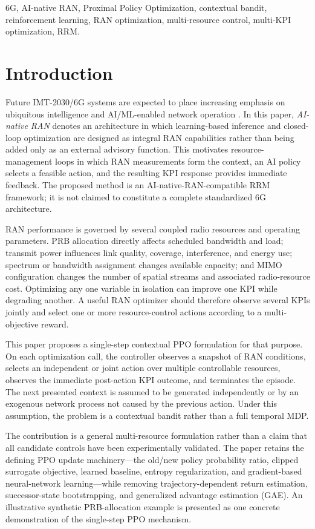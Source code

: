 \documentclass[conference]{IEEEtran}
\begin{document}
\begin{IEEEkeywords}
6G, AI-native RAN, Proximal Policy Optimization, contextual bandit, reinforcement learning, RAN optimization, multi-resource control, multi-KPI optimization, RRM.
\end{IEEEkeywords}

\section{Introduction}
Future IMT-2030/6G systems are expected to place increasing emphasis on ubiquitous intelligence and AI/ML-enabled network operation \cite{itu2030}. In this paper, \emph{AI-native RAN} denotes an architecture in which learning-based inference and closed-loop optimization are designed as integral RAN capabilities rather than being added only as an external advisory function. This motivates resource-management loops in which RAN measurements form the context, an AI policy selects a feasible action, and the resulting KPI response provides immediate feedback. The proposed method is an AI-native-RAN-compatible RRM framework; it is not claimed to constitute a complete standardized 6G architecture.

RAN performance is governed by several coupled radio resources and operating parameters. PRB allocation directly affects scheduled bandwidth and load; transmit power influences link quality, coverage, interference, and energy use; spectrum or bandwidth assignment changes available capacity; and MIMO configuration changes the number of spatial streams and associated radio-resource cost. Optimizing any one variable in isolation can improve one KPI while degrading another. A useful RAN optimizer should therefore observe several KPIs jointly and select one or more resource-control actions according to a multi-objective reward.

This paper proposes a single-step contextual PPO formulation for that purpose. On each optimization call, the controller observes a snapshot of RAN conditions, selects an independent or joint action over multiple controllable resources, observes the immediate post-action KPI outcome, and terminates the episode. The next presented context is assumed to be generated independently or by an exogenous network process not caused by the previous action. Under this assumption, the problem is a contextual bandit rather than a full temporal MDP.

The contribution is a general multi-resource formulation rather than a claim that all candidate controls have been experimentally validated. The paper retains the defining PPO update machinery---the old/new policy probability ratio, clipped surrogate objective, learned baseline, entropy regularization, and gradient-based neural-network learning---while removing trajectory-dependent return estimation, successor-state bootstrapping, and generalized advantage estimation (GAE). An illustrative synthetic PRB-allocation example is presented as one concrete demonstration of the single-step PPO mechanism.
\end{document}
